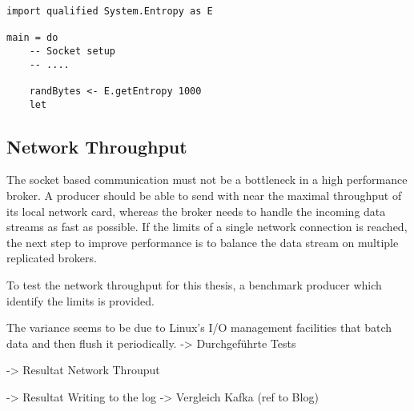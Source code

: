 \begin{lstlisting}
import qualified System.Entropy as E

main = do 
    -- Socket setup 
    -- ....

    randBytes <- E.getEntropy 1000
    let
\end{lstlisting}

\subsection{Network Throughput}
The socket based communication must not be a bottleneck in a high performance
broker. A producer should be able to send with near the maximal throughput of
its local network card, whereas the broker needs to handle the incoming data
streams as fast as possible. If the limits of a single network connection is
reached, the next step to improve performance is to balance the data
stream on multiple replicated brokers.

To test the network throughput for this thesis, a benchmark producer
which identify the limits is provided.



The variance seems to be due to Linux's I/O management facilities that batch
data and then flush it periodically.
-> Durchgeführte Tests 

-> Resultat Network Throuput 

-> Resultat Writing to the log 
-> Vergleich Kafka (ref to Blog) 

